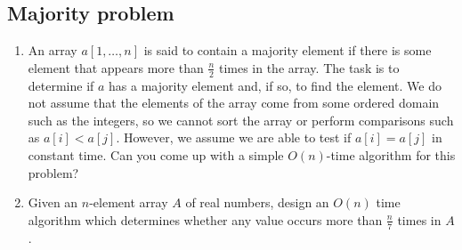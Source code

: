 \subsection{Majority problem}
\begin{Exercise}
\begin{enumerate}
\item An array $a[1, \dots, n]$ is said to contain a majority element if there is some element that appears more than $\frac{n}{2}$ times in the array. The task is to determine if $a$ has a majority element and, if so, to find the element. We do not assume that the elements of the array come from some ordered domain such as the integers, so we cannot sort the array or perform comparisons such as $a[i] < a[j]$. However, we assume we are able to test if $a[i] = a[j]$ in constant time. Can you come up with a simple $O(n)$-time algorithm for this problem? \label{sequence:maj1} 
\item Given an $n$-element array $A$ of real numbers, design an $O(n)$ time algorithm which determines whether any value occurs more than $\frac{n}{7}$ times in $A$. \label{sequence:maj2}
\end{enumerate}
\end{Exercise}

